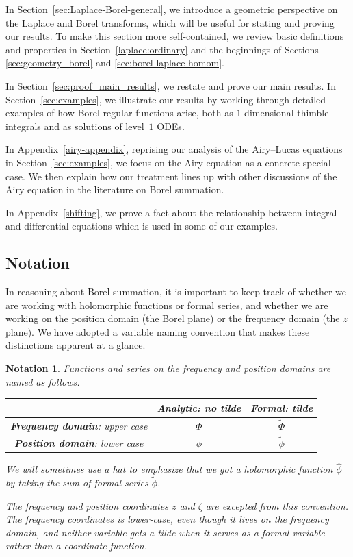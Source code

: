 \documentclass{article}
\newcommand{\series}[1]{\tilde{#1}}
\theoremstyle{definition}
\theoremstyle{plain}
\newtheorem*{notation*}{Notation}
\begin{document}
In Section~\ref{sec:Laplace-Borel-general}, we introduce a geometric perspective on the Laplace and Borel transforms, which will be useful for stating and proving our results. To make this section more self-contained, we review basic definitions and properties in Section~\ref{laplace:ordinary} and the beginnings of Sections \ref{sec:geometry_borel} and \ref{sec:borel-laplace-homom}.

In Section~\ref{sec:proof_main_results}, we restate and prove our main results. In Section~\ref{sec:examples}, we illustrate our results by working through detailed examples of how Borel regular functions arise, both as $1$-dimensional thimble integrals and as solutions of level~$1$ ODEs.

In Appendix~\ref{airy-appendix}, reprising our analysis of the Airy--Lucas equations in Section~\ref{sec:examples}, we focus on the Airy equation as a concrete special case. We then explain how our treatment lines up with other discussions of the Airy equation in the literature on Borel summation.

In Appendix~\ref{shifting}, we prove a fact about the relationship between integral and differential equations which is used in some of our examples.
%
\subsection{Notation}
In reasoning about Borel summation, it is important to keep track of whether we are working with holomorphic functions or formal series, and whether we are working on the position domain (the Borel plane) or the frequency domain (the $z$ plane). We have adopted a variable naming convention that makes these distinctions apparent at a glance.
\begin{notation*}
Functions and series on the frequency and position domains are named as follows.
\begin{center}
\begin{tabular}{c|c|c}
& \textbf{Analytic}: no tilde & \textbf{Formal}: tilde \\[1mm] \hline
\vphantom{\rule{0mm}{5mm}} \textbf{Frequency domain}: upper case & $\Phi$ & $\series{\Phi}$ \\[1mm] \hline
\vphantom{\rule{0mm}{5mm}} \textbf{Position domain}: lower case & $\phi$ & $\series{\phi}$ \\[1mm]
\end{tabular}
\end{center}
We will sometimes use a hat to emphasize that we got a holomorphic function $\hat{\phi}$ by taking the sum of formal series $\series{\phi}$.

The frequency and position coordinates $z$ and $\zeta$ are excepted from this convention. The frequency coordinates is lower-case, even though it lives on the frequency domain, and neither variable gets a tilde when it serves as a formal variable rather than a coordinate function.
\end{notation*}
\end{document}
